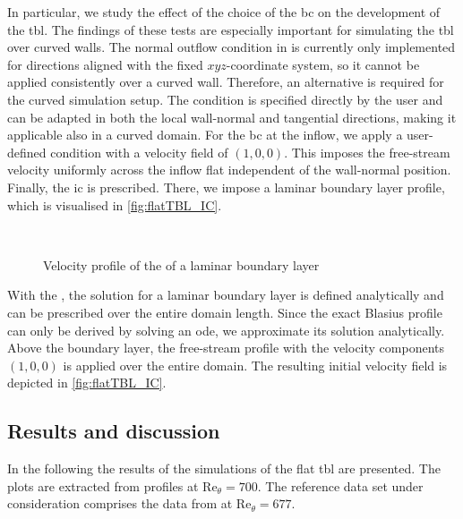 \newpage
In particular, we study the effect of the choice of the \acrshort{bc} on the development of the \acrshort{tbl}.
The findings of these tests are especially important for simulating the \acrshort{tbl} over curved walls.
The normal outflow condition in  is currently only implemented for directions aligned with the fixed $xyz$-coordinate system, so it cannot be applied consistently over a curved wall.
Therefore, an alternative is required for the curved simulation setup.
The  condition is specified directly by the user and can be adapted in both the local wall-normal and tangential directions, making it applicable also in a curved domain.
For the \acrshort{bc} at the inflow, we apply a user-defined  condition with a velocity field of $(1, 0 ,0)$.
This imposes the free-stream velocity uniformly across the inflow flat independent of the wall-normal position.
Finally, the \acrshort{ic} is prescribed.
There, we impose a laminar boundary layer profile, which is visualised in \autoref{fig:flatTBL_IC}.

\begin{figure}[h!]
    \centering
    
    \\[0pt]
    \caption{Velocity profile of the  of a laminar boundary layer}
    \label{fig:BlasiusIC}
\end{figure}


With the , the solution for a laminar boundary layer is defined analytically and can be prescribed over the entire domain length. 
Since the exact Blasius profile can only be derived by solving an \acrfull{ode}, we approximate its solution analytically.
Above the boundary layer, the free-stream profile with the velocity components $(1, 0, 0)$ is applied over the entire domain.
The resulting initial velocity field is depicted in \autoref{fig:flatTBL_IC}.



\subsection{Results and discussion} \label{subsec:flatTBLResults}
In the following the results of the simulations of the flat \acrshort{tbl} are presented.
The plots are extracted from profiles at $\mathrm{Re}_{\theta} = 700$.
The reference data set under consideration comprises the data from \citet{schlatter_assessment_2010} at $\mathrm{Re}_{\theta} = 677$.

